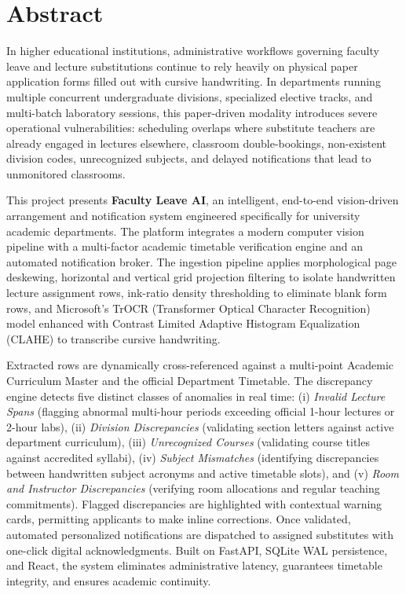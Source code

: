 \documentclass[12pt,letterpaper]{report}
\begin{document}
\newpage
\chapter*{Abstract}

In higher educational institutions, administrative workflows governing faculty leave and lecture substitutions continue to rely heavily on physical paper application forms filled out with cursive handwriting. In departments running multiple concurrent undergraduate divisions, specialized elective tracks, and multi-batch laboratory sessions, this paper-driven modality introduces severe operational vulnerabilities: scheduling overlaps where substitute teachers are already engaged in lectures elsewhere, classroom double-bookings, non-existent division codes, unrecognized subjects, and delayed notifications that lead to unmonitored classrooms.

This project presents \textbf{Faculty Leave AI}, an intelligent, end-to-end vision-driven arrangement and notification system engineered specifically for university academic departments. The platform integrates a modern computer vision pipeline with a multi-factor academic timetable verification engine and an automated notification broker. The ingestion pipeline applies morphological page deskewing, horizontal and vertical grid projection filtering to isolate handwritten lecture assignment rows, ink-ratio density thresholding to eliminate blank form rows, and Microsoft’s TrOCR (Transformer Optical Character Recognition) model enhanced with Contrast Limited Adaptive Histogram Equalization (CLAHE) to transcribe cursive handwriting.

Extracted rows are dynamically cross-referenced against a multi-point Academic Curriculum Master and the official Department Timetable. The discrepancy engine detects five distinct classes of anomalies in real time: (i) \textit{Invalid Lecture Spans} (flagging abnormal multi-hour periods exceeding official 1-hour lectures or 2-hour labs), (ii) \textit{Division Discrepancies} (validating section letters against active department curriculum), (iii) \textit{Unrecognized Courses} (validating course titles against accredited syllabi), (iv) \textit{Subject Mismatches} (identifying discrepancies between handwritten subject acronyms and active timetable slots), and (v) \textit{Room and Instructor Discrepancies} (verifying room allocations and regular teaching commitments). Flagged discrepancies are highlighted with contextual warning cards, permitting applicants to make inline corrections. Once validated, automated personalized notifications are dispatched to assigned substitutes with one-click digital acknowledgments. Built on FastAPI, SQLite WAL persistence, and React, the system eliminates administrative latency, guarantees timetable integrity, and ensures academic continuity.
\end{document}
